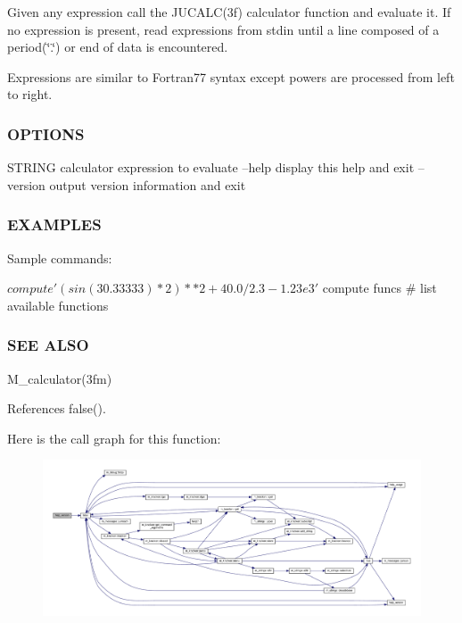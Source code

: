 Given any expression call the J\+U\+C\+A\+L\+C(3f) calculator function and evaluate it. If no expression is present, read expressions from stdin until a line composed of a period(\char`\"{}.\char`\"{}) or end of data is encountered.

Expressions are similar to Fortran77 syntax except powers are processed from left to right. \subsubsection*{O\+P\+T\+I\+O\+NS}

S\+T\+R\+I\+NG calculator expression to evaluate --help display this help and exit --version output version information and exit \subsubsection*{E\+X\+A\+M\+P\+L\+ES}

\begin{DoxyVerb}    Sample commands:

     $ compute '(sin(30.33333)*2)**2+40.0/2.3-1.23e3'

     $ compute funcs # list available functions
\end{DoxyVerb}


\subsubsection*{S\+EE A\+L\+SO}

M\+\_\+calculator(3fm) 

References false().

Here is the call graph for this function\+:
\nopagebreak
\begin{figure}[H]
\begin{center}
\leavevmode
\includegraphics[width=350pt]{compute_8f90_a39c21619b08a3c22f19e2306efd7f766_cgraph}
\end{center}
\end{figure}
\mbox{\label{compute_8f90_a6b077f312d27a28f21803c6d624132b7}} 
